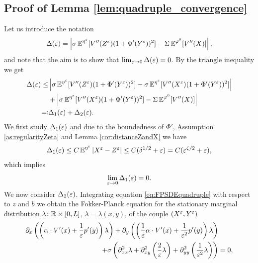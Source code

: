 \documentclass[10pt]{article}
\begin{document}
\begin{appendices}
\subsection{Proof of Lemma \ref{lem:quadruple_convergence}}

	Let us introduce the notation 
	\begin{equation}
	\Delta(\varepsilon) = \left| \sigma \operatorname{\mathbb{E}}^{\eta^\varepsilon} [V''(Z^\varepsilon) (1 + \Phi'(Y^\varepsilon))^2] - \Sigma \operatorname{\mathbb{E}}^{\varphi^0} [V''(X)] \right|,
	\end{equation}
	and note that the aim is to show that $\lim_{\varepsilon \to 0} \Delta(\varepsilon) = 0$. By the triangle inequality we get
	\begin{equation}
	\begin{aligned}
	\Delta(\varepsilon) \le& \left| \sigma \operatorname{\mathbb{E}}^{\eta^\varepsilon} [V''(Z^\varepsilon) (1 + \Phi'(Y^\varepsilon))^2] - \sigma \operatorname{\mathbb{E}}^{\eta^\varepsilon} [V''(X^\varepsilon) (1 + \Phi'(Y^\varepsilon))^2] \right| \\
	&+ \left| \sigma \operatorname{\mathbb{E}}^{\eta^\varepsilon} [V''(X^\varepsilon) (1 + \Phi'(Y^\varepsilon))^2] - \Sigma \operatorname{\mathbb{E}}^{\varphi^0} [V''(X)] \right| \\
	\eqqcolon& \Delta_1(\varepsilon) + \Delta_2(\varepsilon).
	\end{aligned}
	\end{equation}
	We first study $\Delta_1(\varepsilon)$ and due to the boundedness of $\Phi'$, Assumption \ref{as:regularityZeta} and Lemma \ref{cor:distanceZandX} we have
	\begin{equation}
	\Delta_1(\varepsilon) \le C \operatorname{\mathbb{E}}^{\eta^\varepsilon} \left\lvert X^\varepsilon - Z^\varepsilon\right\rvert \le C (\delta^{1/2} + \varepsilon) = C (\varepsilon^{\zeta/2} + \varepsilon),
	\end{equation}
	which implies
	\begin{equation}
	\lim_{\varepsilon \to 0} \Delta_1(\varepsilon) = 0.
	\end{equation}
	We now consider $\Delta_2(\varepsilon)$. Integrating equation \eqref{eq:FPSDEquadruple} with respect to $z$ and $b$ we obtain the Fokker-Planck equation for the stationary marginal distribution $\lambda \colon \mathbb{R} \times [0,L]$, $\lambda = \lambda(x,y)$, of the couple $(X^\varepsilon,Y^\varepsilon)$
	\begin{equation}
	\begin{aligned}
	\partial_x \left( \left( \alpha \cdot V'(x) + \frac1\epl p'(y) \right) \lambda \right) + \partial_y \left( \left( \frac1\epl \alpha \cdot V'(x) + \frac{1}{\epl^2} p'(y) \right) \lambda \right) & \\
	+ \sigma \left( \partial_{xx}^2 \lambda + \partial_{xy}^2 \left( \frac2\epl \lambda \right) + \partial_{yy}^2 \left( \frac{1}{\epl^2} \lambda \right) \right) &= 0,
	\end{aligned}

\end{equation}
\end{appendices}
\end{document}
